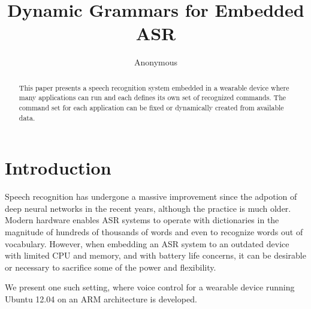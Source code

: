 \documentclass{llncs}
\begin{document}
\newtheorem{Definition}{Definition}
\title{Dynamic Grammars for Embedded ASR}

\author{Anonymous}



\maketitle

\begin{abstract}
This paper presents a speech recognition system embedded in a wearable device
where many applications can run and each defines its own set of recognized
commands. The command set for each application can be fixed or dynamically
created from available data.
\end{abstract}

\section{Introduction}
Speech recognition has undergone a massive improvement since the adpotion of
deep neural networks in the recent years\cite{hinton2012deep}, although the
practice is much older\cite{morgan1995neural}. Modern hardware enables ASR
systems to operate with dictionaries in the magnitude of hundreds of thousands
of words and even to recognize words out of vocabulary. However, when embedding
an ASR system\cite{huggins2006pocketsphinx} to an outdated device with limited
CPU and memory, and with battery life concerns, it can be desirable or necessary
to sacrifice some of the power and flexibility.

We present one such setting, where voice control for a wearable device running
Ubuntu 12.04 on an ARM architecture is developed.
\end{document}
